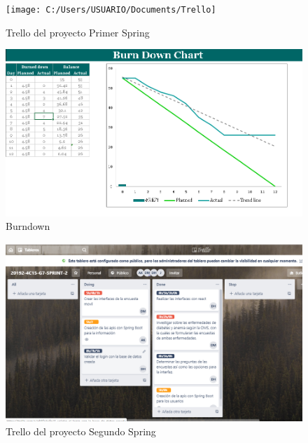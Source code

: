 \begin{figure}
	\centering
	\texttt{[image: C:/Users/USUARIO/Documents/Trello]}
	\caption[Figura 1]{Trello del proyecto Primer Spring}
	\label{fig:trello}
\end{figure}

\begin{figure}
	\centering
	\includegraphics[width=1.2\linewidth]{img/Burndown}
	\caption[Figura 2]{Burndown}
	\label{fig:burndown}
\end{figure}

\begin{figure}
	\centering
	\includegraphics[width=1.1\linewidth]{img/Spring2}
	\caption[Figura 3]{Trello del proyecto Segundo Spring}
	\label{fig:spring2}
\end{figure}




